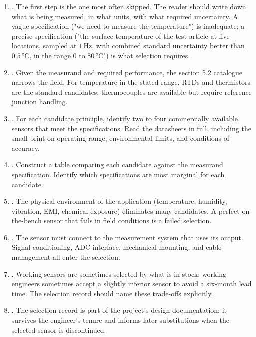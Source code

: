 \begin{enumerate}[leftmargin=*]
  \item {}. The first step is the
    one most often skipped. The reader should write down what is
    being measured, in what units, with what required uncertainty.
    A vague specification ("we need to measure the temperature") is
    inadequate; a precise specification ("the surface temperature
    of the test article at five locations, sampled at $1 \,\si
    {\hertz}$, with combined standard uncertainty better than
    $0.5 \,\si{\degreeCelsius}$, in the range $0$ to $80 \,\si
    {\degreeCelsius}$") is what selection requires.
  \item {}. Given the
    measurand and required performance, the section 5.2 catalogue
    narrows the field. For temperature in the stated range, RTDs
    and thermistors are the standard candidates; thermocouples are
    available but require reference junction handling.
  \item {}. For each candidate
    principle, identify two to four commercially available sensors
    that meet the specifications. Read the datasheets in full,
    including the small print on operating range, environmental
    limits, and conditions of accuracy.
  \item {}.
    Construct a table comparing each candidate against the
    measurand specification. Identify which specifications are
    most marginal for each candidate.
  \item {}. The
    physical environment of the application (temperature, humidity,
    vibration, EMI, chemical exposure) eliminates many candidates.
    A perfect-on-the-bench sensor that fails in field conditions is
    a failed selection.
  \item {}. The sensor
    must connect to the measurement system that uses its output.
    Signal conditioning, ADC interface, mechanical mounting, and
    cable management all enter the selection.
  \item {}. Working sensors are
    sometimes selected by what is in stock; working engineers
    sometimes accept a slightly inferior sensor to avoid a
    six-month lead time. The selection record should name these
    trade-offs explicitly.
  \item {}. The selection record is
    part of the project's design documentation; it survives the
    engineer's tenure and informs later substitutions when the
    selected sensor is discontinued.
\end{enumerate}

